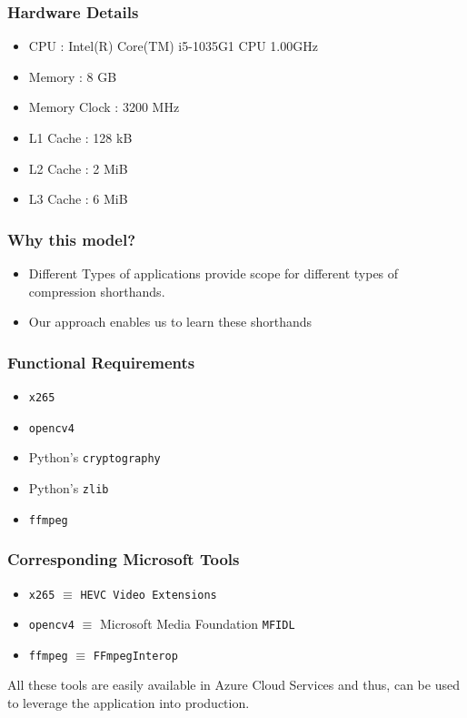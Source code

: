\documentclass{beamer}
\begin{document}
\begin{frame}
    \frametitle{Hardware Details}
    \begin{itemize}
        \item CPU : Intel(R) Core(TM) i5-1035G1 CPU \@ 1.00GHz

        \item Memory : 8 GB
        \item Memory Clock : 3200 MHz
        \item L1 Cache : 128 kB
        \item L2 Cache : 2 MiB
        \item L3 Cache : 6 MiB
    \end{itemize}
\end{frame}

\begin{frame}
    \frametitle{Why this model?}
    \begin{itemize}
        \item Different Types of applications provide scope for different types of compression shorthands.
        \item Our approach enables us to learn these shorthands
    \end{itemize}
\end{frame}

\begin{frame}
    \frametitle{Functional Requirements}
    \begin{itemize}
        \item \texttt{x265}
        \item \texttt{opencv4}
        \item Python's \texttt{cryptography}
        \item Python's \texttt{zlib}
        \item \texttt{ffmpeg}
    \end{itemize}
\end{frame}

\begin{frame}
    \frametitle{Corresponding Microsoft Tools}
    \begin{itemize}
        \item \texttt{x265} $\equiv$ \texttt{HEVC Video Extensions}
        \item \texttt{opencv4} $\equiv$ Microsoft Media Foundation \texttt{MFIDL}
        \item \texttt{ffmpeg} $\equiv$ \texttt{FFmpegInterop}
    \end{itemize}

    All these tools are easily available in Azure Cloud Services and thus, can be used to leverage the application into production.
\end{frame}
\end{document}
